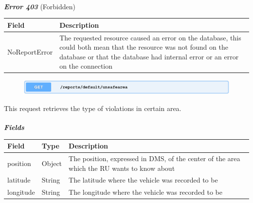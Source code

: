 						\paragraph{}
							\textcolor{myRed}{\textit{\textbf{Error 403}}} (Forbidden)
							\vspace{-2mm}
							\begin{table}[!h]
								\begin{tabular}{L{0.35\textwidth}L{0.57\textwidth}}
									\toprule
									\textbf{Field} & \textbf{Description} \\
									\midrule
								  	 NoReportError & The requested resource caused an error on the database, this could both mean that the resource was not found on the database or that the database had internal error or an error on the connection \\
								 	\bottomrule
								\end{tabular}
							\end{table}
	
							\clearpage
							\begin{figure}[!h]
								\includegraphics[width=\textwidth]{images/Restful/GetUnsafeAreas}
							\end{figure}
						
						This request retrieves the type of violations in certain area.
						\paragraph{}
							\textit{\textbf{Fields}}
							\vspace{-2mm}
							\begin{table}[!h]
								\begin{tabular}{L{0.2\textwidth}L{0.15\textwidth}L{0.45\textwidth}}
									\toprule
									\textbf{Field} & \textbf{Type} & \textbf{Description} \\
									\midrule
								 	position & Object & The position, expressed in DMS, of the center of the area which the RU wants to know about \\
								 	\hspace{2.5mm}latitude & String & The latitude where the vehicle was recorded to be \\
								 	\hspace{2.5mm}longitude & String & The longitude where the vehicle was recorded to be \\
								 	\bottomrule
								\end{tabular}
							\end{table}
